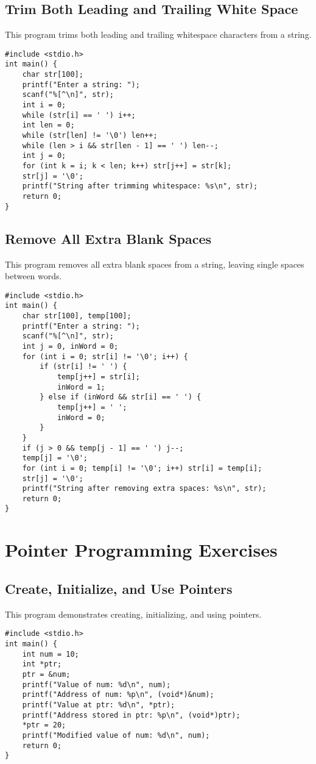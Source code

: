 \documentclass[a4paper,12pt]{article}
\begin{document}
\subsection{Trim Both Leading and Trailing White Space}
This program trims both leading and trailing whitespace characters from a string.
\begin{lstlisting}[caption={Trim Both Leading and Trailing White Space}]
#include <stdio.h>
int main() {
    char str[100];
    printf("Enter a string: ");
    scanf("%[^\n]", str);
    int i = 0;
    while (str[i] == ' ') i++;
    int len = 0;
    while (str[len] != '\0') len++;
    while (len > i && str[len - 1] == ' ') len--;
    int j = 0;
    for (int k = i; k < len; k++) str[j++] = str[k];
    str[j] = '\0';
    printf("String after trimming whitespace: %s\n", str);
    return 0;
}
\end{lstlisting}
\clearpage

\subsection{Remove All Extra Blank Spaces}
This program removes all extra blank spaces from a string, leaving single spaces between words.
\begin{lstlisting}[caption={Remove All Extra Blank Spaces}]
#include <stdio.h>
int main() {
    char str[100], temp[100];
    printf("Enter a string: ");
    scanf("%[^\n]", str);
    int j = 0, inWord = 0;
    for (int i = 0; str[i] != '\0'; i++) {
        if (str[i] != ' ') {
            temp[j++] = str[i];
            inWord = 1;
        } else if (inWord && str[i] == ' ') {
            temp[j++] = ' ';
            inWord = 0;
        }
    }
    if (j > 0 && temp[j - 1] == ' ') j--;
    temp[j] = '\0';
    for (int i = 0; temp[i] != '\0'; i++) str[i] = temp[i];
    str[j] = '\0';
    printf("String after removing extra spaces: %s\n", str);
    return 0;
}
\end{lstlisting}
\clearpage

\section{Pointer Programming Exercises}

\subsection{Create, Initialize, and Use Pointers}
This program demonstrates creating, initializing, and using pointers.
\begin{lstlisting}[caption={Create, Initialize, and Use Pointers}]
#include <stdio.h>
int main() {
    int num = 10;
    int *ptr;
    ptr = &num;
    printf("Value of num: %d\n", num);
    printf("Address of num: %p\n", (void*)&num);
    printf("Value at ptr: %d\n", *ptr);
    printf("Address stored in ptr: %p\n", (void*)ptr);
    *ptr = 20;
    printf("Modified value of num: %d\n", num);
    return 0;
}
\end{lstlisting}
\clearpage
\end{document}
